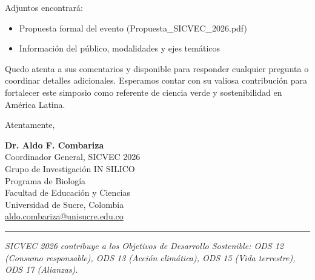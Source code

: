 \documentclass[12pt,a4paper]{article}
\begin{document}
\vspace{0.3cm}

Adjuntos encontrará:
\begin{itemize}
  \item Propuesta formal del evento (Propuesta\_SICVEC\_2026.pdf)
  \item Información del público, modalidades y ejes temáticos
\end{itemize}

\vspace{0.3cm}

Quedo atenta a sus comentarios y disponible para responder cualquier pregunta o coordinar detalles adicionales. Esperamos contar con su valiosa contribución para fortalecer este simposio como referente de ciencia verde y sostenibilidad en América Latina.

\vspace{0.4cm}

Atentamente,

\vspace{0.4cm}

\textbf{Dr. Aldo F. Combariza}\\
Coordinador General, SICVEC 2026\\
Grupo de Investigación IN SILICO\\
Programa de Biología\\
Facultad de Educación y Ciencias\\
Universidad de Sucre, Colombia\\
\href{mailto:aldo.combariza@unisucre.edu.co}{aldo.combariza@unisucre.edu.co}

\vspace{0.4cm}

\noindent
\rule{\textwidth}{0.5pt}

\vspace{0.5cm}

\noindent
\textit{\small SICVEC 2026 contribuye a los Objetivos de Desarrollo Sostenible: ODS 12 (Consumo responsable), ODS 13 (Acción climática), ODS 15 (Vida terrestre), ODS 17 (Alianzas).}
\end{document}
